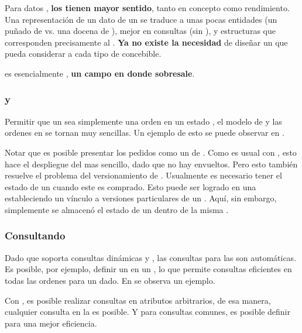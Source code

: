 Para datos \objectOrientedPL, \textbf{los \documentsDB tienen mayor sentido}, tanto en concepto como rendimiento. Una representación \documentOriented de un dato de un \itemCOM se traduce a unas pocas entidades (un puñado de \collectionsDB vs. una docena de \tablesDB), mejor \performanceQA en consultas (sin \serverSideAS \joins), y estructuras que corresponden precisamente al \itemCOM. \textbf{Ya no existe la necesidad} de diseñar un \masterSchema que pueda considerar a cada tipo de \itemCOM concebible.

\catalogManagementCOM es esencialmente \contentManagementCOM, \textbf{un campo en donde \mongodbNAME sobresale}.

\subsubsection{\shoppingCarts y \ordersCommerce}

Permitir que un \shoppingCarts sea simplemente una orden en un estado  \cartCOM, el modelo de \shoppingCarts y las ordenes en \mongodbNAME se tornan muy sencillas. Un ejemplo de esto se puede observar en  .

Notar que es posible presentar los pedidos como un \arrayPL de \itemsCOM. Como es usual con \documentsDB, esto hace el despliegue del \shoppingCart mas sencillo, dado que no hay \joins envueltos. Pero esto también resuelve el problema del versionamiento de \itemsCOM. Usualmente es necesario tener el estado de un \itemCOM cuando este es comprado. Esto puede ser logrado en una \rdbms estableciendo un vínculo a versiones particulares de un \itemCOM. Aquí, sin embargo, simplemente se almacenó el estado de un \itemCOM dentro de la misma \orderCommerce.

\subsubsection{Consultando \ordersCommerce}

Dado que \mongodbNAME soporta consultas dinámicas y \secIndexingDB , las consultas para las \ordersCommerce son automáticas. Es posible, por ejemplo, definir un \indexDB en un \itemCOM \sku, lo que permite consultas eficientes en todas las ordenes para un \itemCOM dado. En   se observa un ejemplo.

Con \mongodbNAME, es posible realizar consultas en atributos arbitrarios, de esa manera, cualquier consulta en la \collectionDB \ordersCommerce es posible. Y para consultas comunes, es posible definir \indexesDB para una mejor eficiencia.


